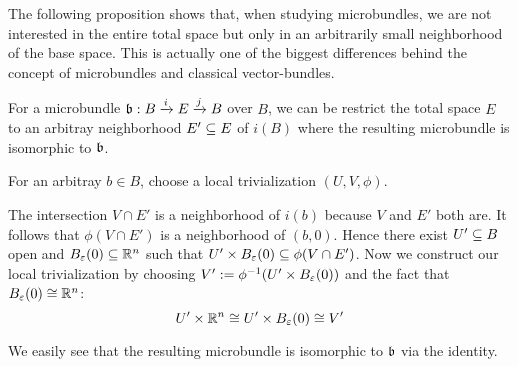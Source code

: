 The following proposition shows that, when studying microbundles,
we are not interested in the entire total space
but only in an arbitrarily small neighborhood of the base space.
This is actually one of the biggest differences behind
the concept of microbundles and classical vector-bundles.

\begin{myproposition}
    For a microbundle $\bundledef{\bb}{B}{E}{i}{j}$ over $B$, we can be restrict the total space $E$ to an arbitray neighborhood $E' \sub E$ of $i(B)$
    where the resulting microbundle is isomorphic to $\bb$.
    \begin{myproof}
        For an arbitray $b \in B$, choose a local trivialization $(U, V, \phi)$.

        The intersection $V \cap E'$ is a neighborhood of $i(b)$ because $V$ and $E'$ both are.
        It follows that $\phi(V \cap E')$ is a neighborhood of $(b, 0)$. Hence there exist $U' \sub B$ open and $\ball[\varepsilon] \sub \R^n$ such that $U' \times \ball[\varepsilon] \sub \phi(V \cap E')$. 
        Now we construct our local trivialization by choosing $V' := \phi^{-1}(U' \times \ball[\varepsilon])$ and the fact that $\ball[\varepsilon] \cong \R^n$:
        \[ U' \times \R^n \cong U' \times \ball[\varepsilon] \cong V' \]

        We easily see that the resulting microbundle is isomorphic to $\bb$ via the identity.
    \end{myproof}
\end{myproposition}